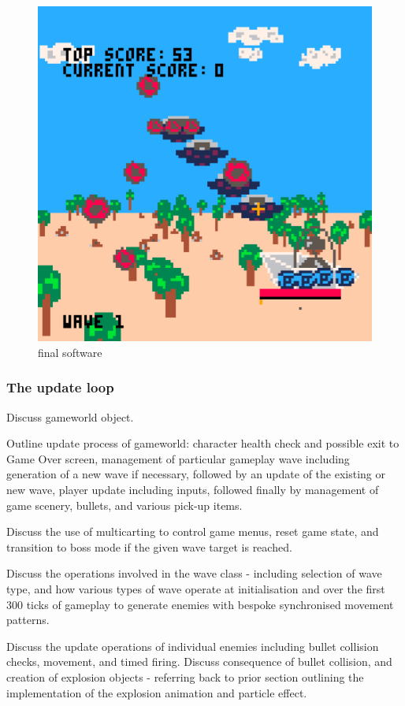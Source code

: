 \documentclass{article}
\begin{document}
\begin{figure}[h]
    \centering
    \includegraphics[width=.8\textwidth]{final3d}
    \caption{final software}
    \label{fig:3dfinal}
\end{figure}

\subsubsection*{The update loop}
Discuss gameworld object.

Outline update process of gameworld: character health check and possible exit to Game Over screen,
management of particular gameplay wave including generation of a new wave if necessary, followed by
an update of the existing or new wave, player update including inputs, followed finally by management
of game scenery, bullets, and various pick-up items.

Discuss the use of multicarting to control game menus, reset game state, and transition to boss mode
if the given wave target is reached.

Discuss the operations involved in the wave class - including selection of wave type, and how various
types of wave operate at initialisation and over the first 300 ticks of gameplay to generate enemies
with bespoke synchronised movement patterns.

Discuss the update operations of individual enemies including bullet collision checks, movement, and
timed firing. Discuss consequence of bullet collision, and creation of explosion objects - referring back
to prior section outlining the implementation of the explosion animation and particle effect.
\end{document}
